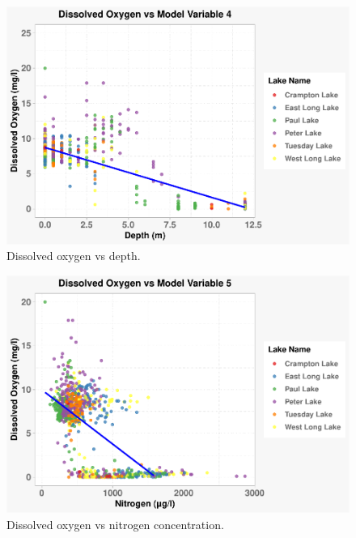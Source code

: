 \documentclass[12pt,]{article}
\begin{document}
\begin{figure}
\centering
\includegraphics{Eadala_ENV872_Project_files/figure-latex/fig12-1.pdf}
\caption{Dissolved oxygen vs depth.}
\end{figure}

\begin{figure}
\centering
\includegraphics{Eadala_ENV872_Project_files/figure-latex/fig13-1.pdf}
\caption{Dissolved oxygen vs nitrogen concentration.}
\end{figure}
\end{document}
